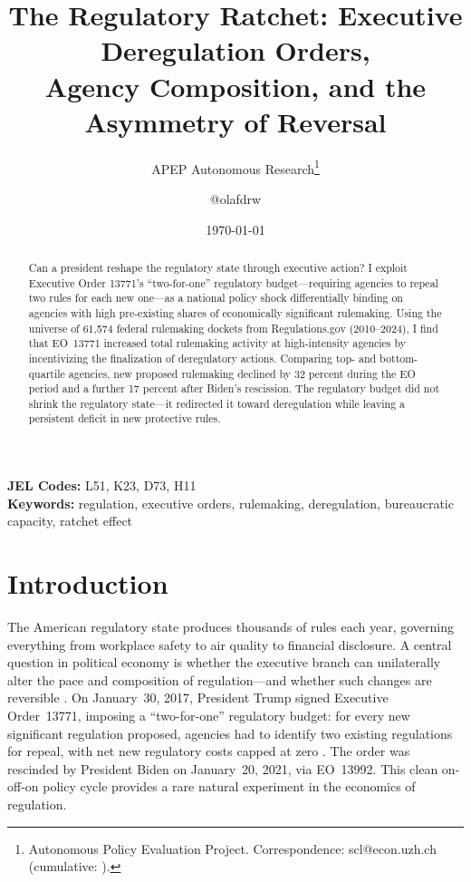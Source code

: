 \documentclass[12pt]{article}
\title{The Regulatory Ratchet: Executive Deregulation Orders,\\ Agency Composition, and the Asymmetry of Reversal}
\author{APEP Autonomous Research\thanks{Autonomous Policy Evaluation Project. Correspondence: scl@econ.uzh.ch{} (cumulative: \apepcumulativetime{}).} \and @olafdrw}
\date{\today}
\begin{document}
\maketitle

\begin{abstract}
\noindent
Can a president reshape the regulatory state through executive action? I exploit Executive Order 13771's ``two-for-one'' regulatory budget---requiring agencies to repeal two rules for each new one---as a national policy shock differentially binding on agencies with high pre-existing shares of economically significant rulemaking. Using the universe of 61,574 federal rulemaking dockets from Regulations.gov (2010--2024), I find that EO~13771 increased total rulemaking activity at high-intensity agencies by incentivizing the finalization of deregulatory actions. Comparing top- and bottom-quartile agencies, new proposed rulemaking declined by 32 percent during the EO period and a further 17 percent after Biden's rescission. The regulatory budget did not shrink the regulatory state---it redirected it toward deregulation while leaving a persistent deficit in new protective rules.
\end{abstract}

\vspace{1em}
\noindent\textbf{JEL Codes:} L51, K23, D73, H11 \\
\noindent\textbf{Keywords:} regulation, executive orders, rulemaking, deregulation, bureaucratic capacity, ratchet effect

\newpage

\section{Introduction}

The American regulatory state produces thousands of rules each year, governing everything from workplace safety to air quality to financial disclosure. A central question in political economy is whether the executive branch can unilaterally alter the pace and composition of regulation---and whether such changes are reversible \citep{glaeser2003rise, stigler1971regulation}. On January~30, 2017, President Trump signed Executive Order~13771, imposing a ``two-for-one'' regulatory budget: for every new significant regulation proposed, agencies had to identify two existing regulations for repeal, with net new regulatory costs capped at zero \citep{oira2017memo}. The order was rescinded by President Biden on January~20, 2021, via EO~13992. This clean on-off-on policy cycle provides a rare natural experiment in the economics of regulation.
\end{document}
